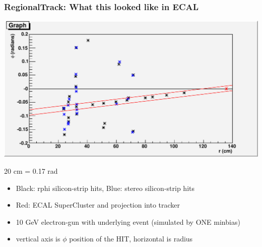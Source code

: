 \documentclass[12pt,compress]{beamer}
\begin{document}
\begin{frame}
\begin{center}

\end{center}
\end{frame}

\begin{frame}
\frametitle{RegionalTrack: What this looked like in ECAL}

\begin{center}
\includegraphics[width=0.7\linewidth]{ecal_event} \hspace{1 cm}\begin{sideways}20 cm = 0.17 rad\end{sideways}
\end{center}
\begin{minipage}{\linewidth}
\small
\begin{itemize}\setlength{\itemsep}{-0.1 cm}
\item Black: rphi silicon-strip hits, Blue: stereo silicon-strip hits
\item Red: ECAL SuperCluster and projection into tracker
\item 10 GeV electron-gun with underlying event (simulated by ONE minbias)
\item vertical axis is $\phi$ position of the HIT, horizontal is radius
\end{itemize}
\end{minipage}
\end{frame}
\end{document}
